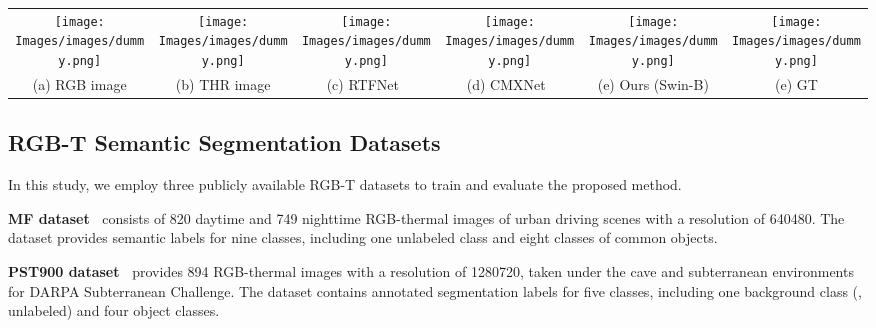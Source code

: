 \documentclass[10pt,twocolumn,letterpaper]{article}
\begin{document}
\begin{figure*}[t]
\begin{center}
{\begin{tabular}{c@{\hskip 0.005\linewidth}c@{\hskip 0.005\linewidth}c@{\hskip 0.005\linewidth}c@{\hskip 0.005\linewidth}c@{\hskip 0.005\linewidth}c}
\texttt{[image: Images/images/dummy.png]} & \texttt{[image: Images/images/dummy.png]} & 
\texttt{[image: Images/images/dummy.png]} & \texttt{[image: Images/images/dummy.png]} & 
\texttt{[image: Images/images/dummy.png]} & \texttt{[image: Images/images/dummy.png]} \vspace{-0.1in} \\ 
{\footnotesize (a) RGB image} & {\footnotesize (b) THR image} & {\footnotesize (c) RTFNet~\cite{sun2019rtfnet} } & {\footnotesize (d) CMXNet~\cite{liu2022cmx}} &  {\footnotesize (e) Ours (Swin-B)} &  {\footnotesize (e) GT}  \\ 
\end{tabular}
}
\end{center}
\vspace{-0.2in}
\caption{{\bf Qualitative comparison for semantic segmentation of RGB-T images on MF~\cite{ha2017mfnet}, PST900~\cite{shivakumar2019pst900}, and KP~\cite{hwang2015multispectral} datasets.} 
The first two rows are qualitative comparisons of MF dataset, the next two rows are PST 900 dataset results, and the remaining rows are KP dataset results. 
The proposed method shows reliable and accurate segmentation results across all datasets, including day-light, low-light, noisy images, and harsh cave conditions.}
\label{fig:qualitative_results}
\vspace{-0.2in}
\end{figure*}








 
\subsection{RGB-T Semantic Segmentation Datasets} 
In this study, we employ three publicly available RGB-T datasets to train and evaluate the proposed method.

\textbf{MF dataset~\cite{ha2017mfnet}} consists of 820 daytime and 749 nighttime RGB-thermal images of urban driving scenes with a resolution of 640480. 
The dataset provides semantic labels for nine classes, including one unlabeled class and eight classes of common objects.

\textbf{PST900 dataset~\cite{shivakumar2019pst900}} provides 894 RGB-thermal images with a resolution of 1280720, taken under the cave and subterranean environments for DARPA Subterranean Challenge.
The dataset contains annotated segmentation labels for five classes, including one background class (\ie, unlabeled) and four object classes.
\end{document}
